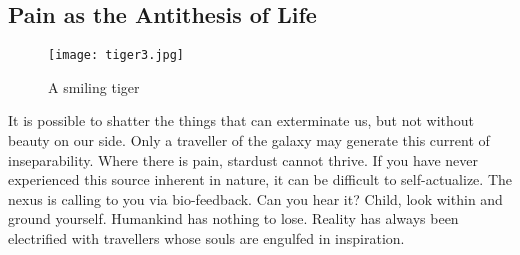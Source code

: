 \subsection{Pain as the Antithesis of Life}



\begin{wrapfigure}{r}{0.33\textwidth}
  \vspace{-20pt}
  \begin{center}
    \texttt{[image: tiger3.jpg]}
  \caption{ \label{fig:Zrect_eq_model}A smiling tiger}
  \end{center}
  \vspace{-20pt}
\end{wrapfigure}

It is possible to shatter the things that can exterminate us, but not without beauty on our side. Only a traveller of the galaxy may generate this current of inseparability. Where there is pain, stardust cannot thrive.
If you have never experienced this source inherent in nature, it can be difficult to self-actualize. The nexus is calling to you via bio-feedback. Can you hear it? Child, look within and ground yourself.
Humankind has nothing to lose. Reality has always been electrified with travellers whose souls are engulfed in inspiration.